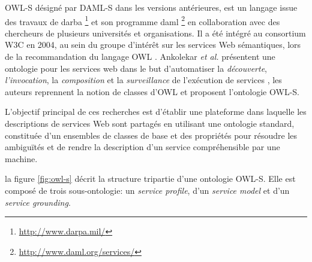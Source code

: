     \textsc{OWL-S} \cite{martin2004owl} désigné par \textsc{DAML-S}
    \cite{ankolekar2002daml} dans les versions antérieures, est un
    langage issue des travaux de \acrshort{darba}
    \footnote{\url{http://www.darpa.mil/}} et son programme
    \acrshort{daml} \footnote{\url{http://www.daml.org/services/}} en
    collaboration avec des chercheurs de plusieurs universités et
    organisations. Il a été intégré au consortium \textsc{W3C} en
    2004, au sein du groupe d'intérêt sur les services Web
    sémantiques, lors de la recommandation du langage \textsc{OWL}
    \cite{horrocks2002daml+oil, mcguinness2004owl}. Ankolekar \emph{et
      al.}  \cite{ankolekar2002daml} présentent une ontologie pour les
    services web dans le but d'automatiser la \emph{découverte},
    \emph{l'invocation}, la \emph{composition} et la
    \emph{surveillance} de l'exécution de services
    \cite{mcilraith2003bringing}, les auteurs reprennent la notion de
    classes d'\textsc{OWL} et proposent l'ontologie \textsc{OWL-S}.
    

    L'objectif principal de ces recherches est d'établir une
    plateforme dans laquelle les descriptions de services Web sont
    partagés en utilisant une ontologie standard, constituée d'un
    ensembles de classes de base et des propriétés pour résoudre les
    ambiguïtés et de rendre la description d'un service compréhensible
    par une machine.\newpage

    la figure \ref{fig:owl-s} décrit la structure tripartie d'une
    ontologie \textsc{OWL-S}. Elle est composé de trois
    sous-ontologie: un \emph{service profile}, d'un \emph{service
      model} et d'un \emph{service grounding}.

